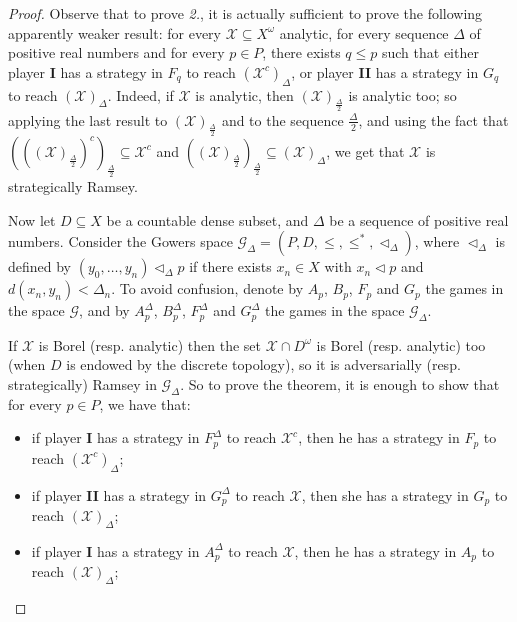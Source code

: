 \documentclass[a4paper,11pt]{article}
\theoremstyle{definition}
\numberwithin{equation}{section}
\newcommand{\X}{\mathcal{X}}
\newcommand{\G}{\mathcal{G}}
\newcommand{\I}{\textbf{I}}
\newcommand{\II}{\textbf{II}}
\begin{document}
\begin{proof}

Observe that to prove \emph{2.}, it is actually sufficient to prove the following apparently weaker result: for every $\X \subseteq X^\omega$ analytic, for every sequence $\Delta$ of positive real numbers and for every $p \in P$, there exists $q \leqslant p$ such that either player \I{} has a strategy in $F_q$ to reach $(\X^c)_\Delta$, or player \II{} has a strategy in $G_q$ to reach $(\X)_\Delta$. Indeed, if $\X$ is analytic, then $(\X)_\frac{\Delta}{2}$ is analytic too; so applying the last result to $(\X)_\frac{\Delta}{2}$ and to the sequence $\frac{\Delta}{2}$, and using the fact that $\left(\left((\X)_{\frac{\Delta}{2}}\right)^c\right)_\frac{\Delta}{2} \subseteq \X^c$ and $\left((\X)_{\frac{\Delta}{2}}\right)_{\frac{\Delta}{2}} \subseteq (\X)_{\Delta}$, we get that $\X$ is strategically Ramsey.

\smallskip

Now let $D \subseteq X$ be a countable dense subset, and $\Delta$ be a sequence of positive real numbers. Consider the Gowers space $\G_\Delta = (P, D, \leqslant, \leqslant^*, \vartriangleleft_\Delta)$, where $\vartriangleleft_\Delta$ is defined by $(y_0, \ldots, y_n) \vartriangleleft_\Delta p$ if there exists $x_n \in X$ with $x_n \vartriangleleft p$ and $d(x_n, y_n) < \Delta_n$. To avoid confusion, denote by $A_p$, $B_p$, $F_p$ and $G_p$ the games in the space $\G$, and by $A_p^\Delta$, $B_p^\Delta$, $F_p^\Delta$ and $G_p^\Delta$ the games in the space $\G_\Delta$.

\smallskip

If $\X$ is Borel (resp. analytic) then the set $\X \cap D^\omega$ is Borel (resp. analytic) too (when $D$ is endowed by the discrete topology), so it is adversarially (resp. strategically) Ramsey in $\G_\Delta$. So to prove the theorem, it is enough to show that for every $p \in P$, we have that:

\begin{itemize}

\item[(i)] if player \I{} has a strategy in $F_p^\Delta$ to reach $\X^c$, then he has a strategy in $F_p$ to reach $(\X^c)_\Delta$;

\item[(ii)] if player \II{} has a strategy in $G_p^\Delta$ to reach $\X$, then she has a strategy in $G_p$ to reach $(\X)_\Delta$;

\item[(iii)] if player \I{} has a strategy in $A_p^\Delta$ to reach $\X$, then he has a strategy in $A_p$ to reach $(\X)_\Delta$;


\end{itemize}
\end{proof}
\end{document}
